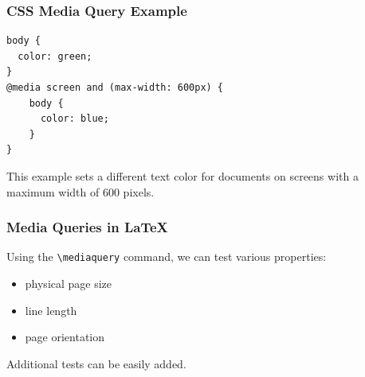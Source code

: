 







\begin{frame}[fragile]
\frametitle{CSS Media Query Example}
\begin{verbatim}
body {
  color: green;
}
@media screen and (max-width: 600px) {
    body {
      color: blue;
    }
}
\end{verbatim}
\end{frame}

This example sets a different text color for documents on screens with a maximum width of 600 pixels.


          
\begin{frame}[fragile]
  \frametitle{Media Queries in \LaTeX}
    Using the \verb|\mediaquery| command, we can test various properties:
  
    \begin{itemize}
  \item physical page size
  \item line length
  \item page orientation
\end{itemize}

Additional tests can be easily added.

\end{frame}


